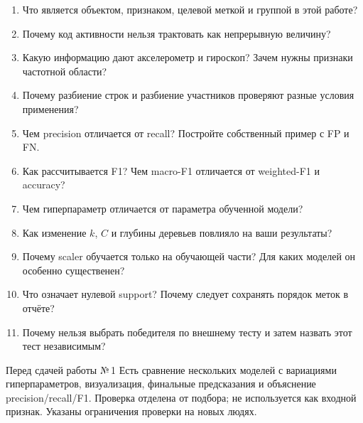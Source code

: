 \begin{enumerate}
\item Что является объектом, признаком, целевой меткой и группой в этой работе?
\item Почему код активности нельзя трактовать как непрерывную величину?
\item Какую информацию дают акселерометр и гироскоп? Зачем нужны признаки частотной области?
\item Почему разбиение строк и разбиение участников проверяют разные условия применения?
\item Чем precision отличается от recall? Постройте собственный пример с FP и FN.
\item Как рассчитывается F1? Чем macro-F1 отличается от weighted-F1 и accuracy?
\item Чем гиперпараметр отличается от параметра обученной модели?
\item Как изменение \(k\), \(C\) и глубины деревьев повлияло на ваши результаты?
\item Почему scaler обучается только на обучающей части? Для каких моделей он особенно существенен?
\item Что означает нулевой support? Почему следует сохранять порядок меток в отчёте?
\item Почему нельзя выбрать победителя по внешнему тесту и затем назвать этот тест независимым?
\end{enumerate}

\begin{keybox}{Перед сдачей работы №\,1}
Есть сравнение нескольких моделей с вариациями гиперпараметров, визуализация, финальные предсказания и объяснение precision/recall/F1. Проверка отделена от подбора;  не используется как входной признак. Указаны ограничения проверки на новых людях.
\end{keybox}
